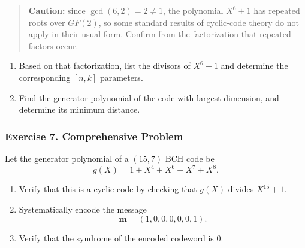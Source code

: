\documentclass[11pt,oneside]{book}
\theoremstyle{plain}
\theoremstyle{definition}
\theoremstyle{remark}
\begin{document}
\begin{quote}
\textbf{Caution:} since \(\gcd(6,2)=2 \neq 1\), the polynomial \(X^6+1\)
has repeated roots over \(GF(2)\), so some standard results of
cyclic-code theory do not apply in their usual form. Confirm from the
factorization that repeated factors occur.
\end{quote}

\begin{enumerate}
\def\labelenumi{(\alph{enumi})}
\setcounter{enumi}{1}
\item
  Based on that factorization, list the divisors of \(X^6+1\) and
  determine the corresponding \([n,k]\) parameters.
\item
  Find the generator polynomial of the code with largest dimension, and
  determine its minimum distance.
\end{enumerate}


\subsubsection{Exercise 7. Comprehensive
Problem}\label{exercise-7.-comprehensive-problem}

Let the generator polynomial of a \((15,7)\) BCH code be
\[g(X)=1+X^4+X^6+X^7+X^8.\]

\begin{enumerate}
\def\labelenumi{(\alph{enumi})}
\item
  Verify that this is a cyclic code by checking that \(g(X)\) divides
  \(X^{15}+1\).
\item
  Systematically encode the message \[\mathbf{m}=(1,0,0,0,0,0,1).\]
\item
  Verify that the syndrome of the encoded codeword is 0.
\end{enumerate}
\end{document}
